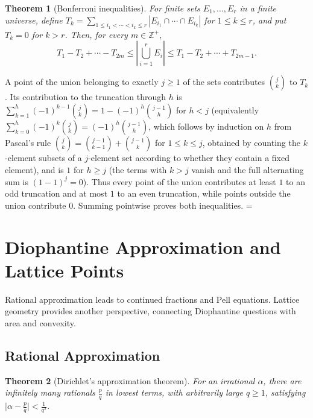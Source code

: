 \documentclass[11pt]{article}
\makeatletter
\let\nt@closedisplay\]
\def\nt@guardedclose{\@ifnextchar\par{\nt@closeafterpar}{\@ifnextchar\end{\postdisplaypenalty\@M\nt@closedisplay}{\nt@closedisplay}}}
\def\nt@closeafterpar\par{\@ifnextchar\par{\nt@closeafterpar}{\@ifnextchar\end{\postdisplaypenalty\@M\nt@closedisplay\par}{\nt@closedisplay\par}}}
\renewenvironment{proof}[1][\proofname]{\par
  \pushQED{\qed}\normalfont\topsep\medskipamount\edef\nt@afterproof{\@endparpenalty=\the\@endparpenalty\relax}\@beginparpenalty\@M\@endparpenalty\@M\let\]\nt@guardedclose\trivlist\item[]\textit{#1\@addpunct{.}} \ignorespaces}{\ifvmode\addpenalty\@M\fi\popQED\nt@afterproof\endtrivlist\@endpefalse}
\theoremstyle{ntstyle}
\newtheorem{theorem}{Theorem}[subsection]
\makeatother
\begin{document}
\begin{theorem}[Bonferroni inequalities]\label{thm:9.7.3}\label{thm:bonferroni-inequalities}
  For
  finite sets $E_1,\ldots,E_r$ in a finite universe, define
  $T_k=\sum_{1\le i_1<\cdots<i_k\le r} |E_{i_1}\cap\cdots\cap E_{i_k}|$ for $1\le k\le r$, and put $T_k=0$
  for $k>r$. Then, for every $m\in\mathbb{Z}^+$,
  \[
    T_1-T_2+\cdots-T_{2m}\le\left|\bigcup_{i=1}^rE_i\right|\le
    T_1-T_2+\cdots+T_{2m-1}.
  \]

\end{theorem}

\begin{proof} A point of the union belonging to exactly $j\ge1$ of the
  sets contributes $\binom{j}{k}$ to $T_k$. Its contribution to the
  truncation through $h$ is $\sum_{k=1}^{h}(-1)^{k-1}\binom{j}{k}=1-(-1)^h\binom{j-1}{h}$ for $h<j$ (equivalently
  $\sum_{k=0}^{h}(-1)^{k}\binom{j}{k}=(-1)^{h}\binom{j-1}{h}$, which
    follows by induction on $h$ from Pascal's rule
  $\binom{j}{k}=\binom{j-1}{k-1}+\binom{j-1}{k}$ for $1\le k\le j$, obtained by counting the $k$-element subsets of
  a $j$-element set according to whether they contain a fixed element), and is $1$ for $h\ge j$ (the terms with
  $k>j$ vanish and the full alternating sum is $(1-1)^{j}=0$). Thus
    every point of the union contributes at least $1$ to an odd truncation and at
    most $1$ to an even truncation, while points outside the union
    contribute $0$. Summing pointwise proves both inequalities.
\end{proof}
\newpage


\section{Diophantine Approximation and Lattice Points}

Rational approximation leads to continued fractions and Pell equations. Lattice geometry provides another
perspective, connecting Diophantine questions with area and convexity.


\subsection{Rational Approximation}

\begin{theorem}[Dirichlet's approximation theorem]\label{thm:10.1.1}\label{thm:dirichlet-approximation-theorem}
  For an irrational $\alpha$,
  there are infinitely many rationals $\tfrac{p}{q}$ in lowest terms, with
  arbitrarily large $q\ge1$, satisfying $\big|\alpha - \tfrac{p}{q}\big| < \tfrac{1}{q^2}$.

\end{theorem}
\end{document}
